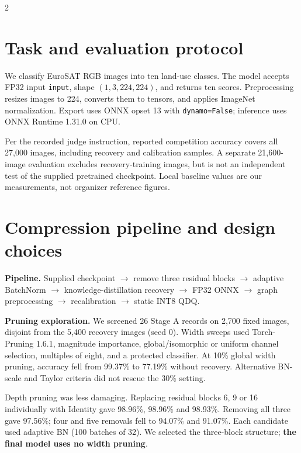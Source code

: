 \documentclass[10pt,letterpaper]{article}
\newcommand{\code}[1]{\texttt{\small #1}}
\begin{document}
\begin{multicols}{2}\raggedcolumns
\section{Task and evaluation protocol}
We classify EuroSAT RGB images into ten land-use classes. The model accepts FP32 input \code{input}, shape $(1,3,224,224)$, and returns ten scores. Preprocessing resizes images to 224, converts them to tensors, and applies ImageNet normalization. Export uses ONNX opset 13 with \code{dynamo=False}; inference uses ONNX Runtime 1.31.0 on CPU.

Per the recorded judge instruction, reported competition accuracy covers all 27,000 images, including recovery and calibration samples. A separate 21,600-image evaluation excludes recovery-training images, but is not an independent test of the supplied pretrained checkpoint. Local baseline values are our measurements, not organizer reference figures.

\section{Compression pipeline and design choices}
\noindent\textbf{Pipeline.} Supplied checkpoint $\rightarrow$ remove three residual blocks $\rightarrow$ adaptive BatchNorm $\rightarrow$ knowledge-distillation recovery $\rightarrow$ FP32 ONNX $\rightarrow$ graph preprocessing $\rightarrow$ recalibration $\rightarrow$ static INT8 QDQ.

\noindent\textbf{Pruning exploration.} We screened 26 Stage A records on 2,700 fixed images, disjoint from the 5,400 recovery images (seed 0). Width sweeps used Torch-Pruning 1.6.1, magnitude importance, global/isomorphic or uniform channel selection, multiples of eight, and a protected classifier. At 10\% global width pruning, accuracy fell from 99.37\% to 77.19\% without recovery. Alternative BN-scale and Taylor criteria did not rescue the 30\% setting.

Depth pruning was less damaging. Replacing residual blocks 6, 9 or 16 individually with Identity gave 98.96\%, 98.96\% and 98.93\%. Removing all three gave 97.56\%; four and five removals fell to 94.07\% and 91.07\%. Each candidate used adaptive BN (100 batches of 32). We selected the three-block structure; \textbf{the final model uses no width pruning}.


\end{multicols}
\end{document}
